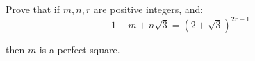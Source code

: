 Prove that if $m,n,r$ are positive integers, and:\[1+m+n\sqrt{3}=(2+\sqrt{3})^{2r-1}  \]

then $m$ is a perfect square.